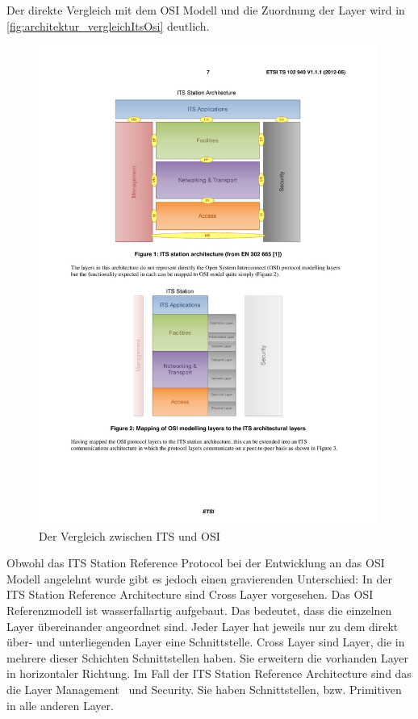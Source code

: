 Der direkte Vergleich mit dem \ac{OSI} Modell und die Zuordnung der Layer wird in \autoref{fig:architektur_vergleichItsOsi} deutlich.

\begin{figure}[h]
	\includegraphics[width=0.99\textwidth]{content/images/02_architektur/vergleichITS-OSI.pdf}
	\caption{Der Vergleich zwischen ITS und OSI \cite{ts102940}}
	\label{fig:architektur_vergleichItsOsi}
\end{figure}

Obwohl das \ac{ITS} Station Reference Protocol bei der Entwicklung an das \ac{OSI} Modell angelehnt wurde gibt es jedoch einen gravierenden Unterschied: In der \ac{ITS} Station Reference Architecture sind Cross Layer vorgesehen. Das \ac{OSI} Referenzmodell ist wasserfallartig aufgebaut. Das bedeutet, dass die einzelnen Layer übereinander angeordnet sind. Jeder Layer hat jeweils nur zu dem direkt über- und unterliegenden Layer eine Schnittstelle. Cross Layer sind Layer, die in mehrere dieser Schichten Schnittstellen haben. Sie erweitern die vorhanden Layer in horizontaler Richtung. Im Fall der \ac{ITS} Station Reference Architecture sind das die Layer \glqq Management\grqq~ und \glqq Security\grqq. Sie haben Schnittstellen, bzw. Primitiven in alle anderen Layer. 

